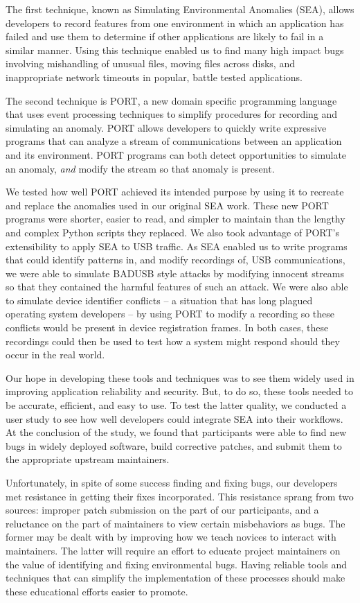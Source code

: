 The first technique,
known as Simulating Environmental Anomalies (SEA),
allows developers to record features from one environment in which
an application has failed and use them to determine if other
applications are likely to fail in a similar manner.
Using this technique enabled us to find many high impact bugs involving mishandling of unusual files,
moving files across disks,
and inappropriate network timeouts
in popular,
battle tested applications.

The second technique is PORT, 
a new  domain specific programming language
that uses event processing techniques
to simplify procedures for recording and simulating an anomaly.
PORT
allows developers
to quickly write expressive programs that can analyze a stream of communications between an application and  its environment.
PORT programs can both detect opportunities to
simulate an anomaly, \textit{and} modify the stream so that anomaly is present.

We tested how well PORT achieved its intended purpose by using it to recreate and
replace the anomalies used in our original SEA work.
These new PORT programs were shorter, easier to read, and simpler to
maintain than the lengthy and complex Python scripts they replaced.
We also took advantage of PORT's extensibility to apply SEA to USB
traffic.
As SEA enabled us to write programs that could identify patterns in, and
modify recordings of, USB communications,
we were able to simulate
BADUSB style attacks by modifying innocent streams
so that they contained the harmful features of such an attack.
We were also able to simulate device identifier conflicts -- a situation that has
long plagued operating system developers -- by using PORT to modify a recording so  these conflicts
would be present in device registration frames.
In both cases, these recordings could then be used
to test how a system might respond should they occur in the real world.

Our hope in developing these tools and techniques was to see them widely
used in improving application reliability and security.
But, to do so, these tools needed to be accurate, efficient, and easy to use. To test the latter quality, we 
conducted a user study to see how well developers could integrate SEA into their workflows.
At the conclusion of the study, we found that participants were able to find new bugs in widely deployed software,
build corrective patches,
and submit them to the appropriate upstream maintainers.

Unfortunately,
in spite of some success finding and fixing bugs,
our developers met resistance in getting their fixes incorporated.
This resistance sprang from two sources: improper patch submission on the part of our participants, and a reluctance on the part of maintainers to view certain misbehaviors as bugs.
The former may be dealt with by improving how we teach novices to interact with maintainers. The latter
will require an effort to educate project maintainers on the value of identifying and fixing environmental bugs. Having reliable tools and techniques that can  simplify the implementation of these processes should make these educational efforts easier to promote. 


\vspace*{3ex plus 1fil}
